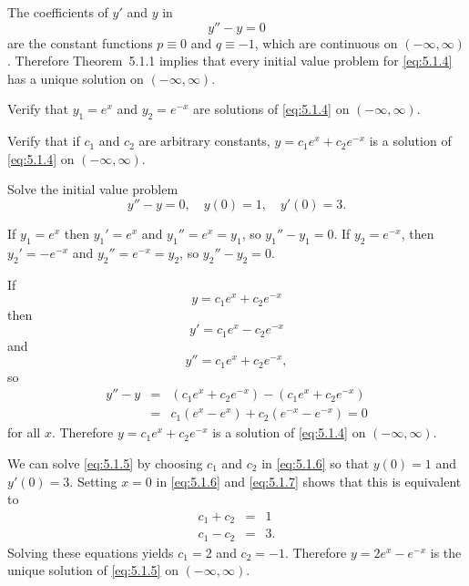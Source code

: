 \setcounter{example}{0}
\setcounter{equation}{3}
\begin{example}
  \label{example:5.1.1} \rm The coefficients of $y'$ and $y$ in
  \begin{equation}
    \label{eq:5.1.4}y''-y=0
  \end{equation}
  are the constant functions $p\equiv0$ and $q\equiv-1$, which are continuous on $(-\infty,\infty)$.
  Therefore Theorem~5.1.1 implies that every initial value problem for
  \eqref{eq:5.1.4} has a unique solution on $(-\infty,\infty)$.
  \begin{alist}
    \item %
    Verify that $y_{1}=e^{x}$ and $y_{2}=e^{-x}$ are solutions of \eqref{eq:5.1.4} on
    $(-\infty,\infty)$.

    \item %
    Verify that if $c_{1}$ and $c_{2}$ are arbitrary constants, $y=c_{1}e^{x}+c_{2}e^{-x}$ is a
    solution of \eqref{eq:5.1.4} on $(-\infty,\infty)$.

    \item %
    Solve the initial value problem
    \begin{equation}
      \label{eq:5.1.5}y''-y=0,\quad y(0)=1,\quad y'(0)=3.
    \end{equation}
  \end{alist}
\end{example}
\setcounter{equation}{5}
\begin{examplesolution}
 If $y_{1}=e^{x}$ then $y_{1}'=e^{x}$ and $y_{1}''=e^{x}=y_{1}$, so
$y_{1}''-y_{1}=0$. If $y_{2}=e^{-x}$, then $y_{2}'=-e^{-x}$ and $y_{2}''=e^{-x}=y_{2}$, so
$y_{2}''-y_{2}=0$.

 If
\begin{equation}
  \label{eq:5.1.6}y=c_{1}e^{x}+c_{2}e^{-x}
\end{equation}
then
\begin{equation}
  \label{eq:5.1.7}y'=c_{1}e^{x}-c_{2}e^{-x}
\end{equation}
and
\[
  y''=c_{1}e^{x}+c_{2}e^{-x},
\]
so
\begin{eqnarray*}
  y''-y & = & (c_{1}e^{x}+c_{2}e^{-x})-(c_{1}e^{x}+c_{2}e^{-x}) \\
        & = & c_{1}(e^{x}-e^{x})+c_{2}(e^{-x}-e^{-x})=0
\end{eqnarray*}
for all $x$. Therefore $y=c_{1}e^{x}+c_{2}e^{-x}$ is a solution of \eqref{eq:5.1.4} on
$(-\infty,\infty)$.

 We can solve \eqref{eq:5.1.5} by choosing $c_{1}$ and $c_{2}$ in \eqref{eq:5.1.6}
so that $y(0)=1$ and $y'(0)=3$. Setting $x=0$ in \eqref{eq:5.1.6} and \eqref{eq:5.1.7} shows that
this is equivalent to
\begin{eqnarray*}
  c_{1}+c_{2} & = & 1 \\
  c_{1}-c_{2} & = & 3.
\end{eqnarray*}
Solving these equations yields $c_{1}=2$ and $c_{2}=-1$. Therefore $y=2e^{x}-e^{-x}$ is the unique
solution of \eqref{eq:5.1.5} on $(-\infty,\infty)$.
\end{examplesolution}

